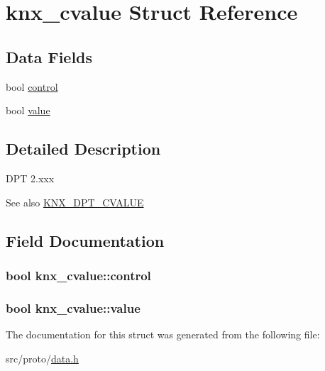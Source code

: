 \hypertarget{structknx__cvalue}{}\section{knx\+\_\+cvalue Struct Reference}
\label{structknx__cvalue}
\subsection*{Data Fields}
\begin{DoxyCompactItemize}
\item 
bool \hyperlink{structknx__cvalue_a36e683b993e9e350a95b6e9a4d405fea}{control}
\item 
bool \hyperlink{structknx__cvalue_ab0b6697a00bc685fe977ff48508e4fd9}{value}
\end{DoxyCompactItemize}


\subsection{Detailed Description}
D\+PT 2.\+xxx \begin{DoxySeeAlso}{See also}
\hyperlink{data_8h_a6e79f8a1b8ff1d0dff30d1fdb401b642a5574e3c6d0396cb5955972e2b62748ed}{K\+N\+X\+\_\+\+D\+P\+T\+\_\+\+C\+V\+A\+L\+UE} 
\end{DoxySeeAlso}


\subsection{Field Documentation}
\subsubsection[{\texorpdfstring{control}{control}}]{\setlength{\rightskip}{0pt plus 5cm}bool knx\+\_\+cvalue\+::control}\hypertarget{structknx__cvalue_a36e683b993e9e350a95b6e9a4d405fea}{}\label{structknx__cvalue_a36e683b993e9e350a95b6e9a4d405fea}
\subsubsection[{\texorpdfstring{value}{value}}]{\setlength{\rightskip}{0pt plus 5cm}bool knx\+\_\+cvalue\+::value}\hypertarget{structknx__cvalue_ab0b6697a00bc685fe977ff48508e4fd9}{}\label{structknx__cvalue_ab0b6697a00bc685fe977ff48508e4fd9}


The documentation for this struct was generated from the following file\+:\begin{DoxyCompactItemize}
\item 
src/proto/\hyperlink{data_8h}{data.\+h}\end{DoxyCompactItemize}
